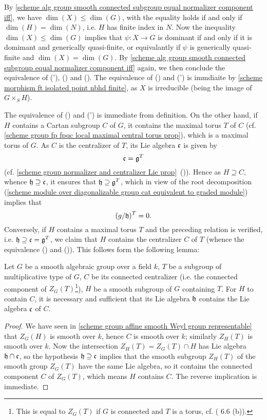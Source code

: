 By \cref{scheme alg group smooth connected subgroup equal normalizer component iff}, we have $\dim(X)\leq\dim(G)$, with the equality holds if and only if $\dim(H)=\dim(N)$, i.e. $H$ has finite index in $N$. Now the inequality $\dim(X)\leq\dim(G)$ implies that $\psi:X\to G$ is dominant if and only if it is domimant and generically quasi-finite, or equivalantly if $\psi$ is generically quasi-finite and $\dim(X)=\dim(G)$. By \cref{scheme alg group smooth connected subgroup equal normalizer component iff} again, we then conclude the equivalence of ('), () and (). The equivalence of () and (') is immdiaite by \cref{scheme morphism ft isolated point nbhd finite}, as $X$ is irreducible (being the image of $G\times_SH$).\par
The equivalence of () and (') is immediate from definition. On the other hand, if $H$ contains a Cartan subgroup $C$ of $G$, it contains the maximal torus $T$ of $C$ (cf. \cref{scheme group fp fpqc local maximal central torus prop}), which is a maximal torus of $G$. As $C$ is the centralizer of $T$, its Lie algebra $\mathfrak{c}$ is given by
\[\mathfrak{c}=\mathfrak{g}^T\]
(cf. \cref{scheme group normalizer and centralizer Lie prop}~()). Hence as $H\supseteq C$, whence $\mathfrak{h}\supseteq\mathfrak{c}$, it ensures that $\mathfrak{h}\supseteq\mathfrak{g}^T$, which in view of the root decomposition (\cref{scheme module over diagonalizable group cat equivalent to graded module}) implies that
\begin{equation}\label{scheme alg group smooth connected subgroup contain Cartan iff-1}
(g/\mathfrak{h})^T=0.
\end{equation}
Conversely, if $H$ contains a maximal torus $T$ and the preceding relation is verified, i.e. $\mathfrak{h}\supseteq\mathfrak{c}=\mathfrak{g}^T$, we claim that $H$ contains the centralizer $C$ of $T$ (whence the equivalence () and ()). This follows form the following lemma:

\begin{lemma}\label{scheme alg group smooth subgroup contain centralizer iff Lie algebra}
Let $G$ be a smooth algebraic group over a field $k$, $T$ be a subgroup of multiplicative type of $G$, $C$ be its connected centralizer (i.e. the connected component of $Z_G(T)$\footnote{This is equal to $Z_G(T)$ if $G$ is connected and $T$ is a torus, cf. (\cite{SGA3-2}  6.6 (b)).}), $H$ be a smooth subgroup of $G$ containing $T$. For $H$ to contain $C$, it is necessary and sufficient that its Lie algebra $\mathfrak{h}$ contains the Lie algebra $\mathfrak{c}$ of $C$.
\end{lemma}
\begin{proof}
We have seen in \cref{scheme group affine smooth Weyl group representable} that $Z_G(H)$ is smooth over $k$, hence $C$ is smooth over $k$; similarly $Z_H(T)$ is smooth over $k$. Now the intersection $Z_H(T)=Z_G(T)\cap H$ has Lie algebra $\mathfrak{h}\cap\mathfrak{c}$, so the hypothesis $\mathfrak{h}\supseteq\mathfrak{c}$ implies that the smooth subgroup $Z_H(T)$ of the smooth group $Z_G(T)$ have the same Lie algebra, so it contains the connected component $C$ of $Z_G(T)$, which means $H$ contains $C$. The reverse implication is immediate.
\end{proof}

